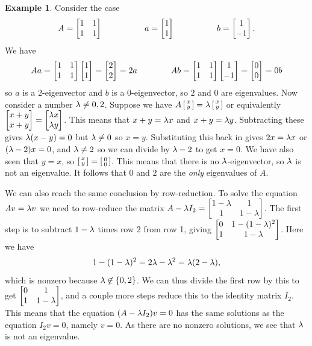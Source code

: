 \documentclass[reqno]{amsart}
\theoremstyle{definition}
\newtheorem{example}[theorem]{Example}
\begin{document}
\begin{example}\label{eg-eigen-i}
 Consider the case
 \[ A = \left[\begin{matrix} 1 & 1 \\ 1 & 1 \end{matrix}\right] \hspace{5em}
     a = \left[\begin{matrix} 1 \\ 1 \end{matrix}\right] \hspace{5em} b = \left[\begin{matrix} 1 \\ -1 \end{matrix}\right].
 \]
 We have
 \[ Aa = \left[\begin{matrix} 1&1 \\ 1&1\end{matrix}\right] \left[\begin{matrix} 1 \\ 1\end{matrix}\right] = \left[\begin{matrix} 2\\ 2\end{matrix}\right] = 2a
    \hspace{4em}
    Ab = \left[\begin{matrix} 1&1 \\ 1&1\end{matrix}\right] \left[\begin{matrix} 1 \\ -1\end{matrix}\right] = \left[\begin{matrix} 0\\ 0\end{matrix}\right] = 0b
 \]
 so $a$ is a $2$-eigenvector and $b$ is a $0$-eigenvector, so $2$ and
 $0$ are eigenvalues.  Now consider a number $\lambda\neq 0,2$.  Suppose
 we have $A\left[\begin{smallmatrix} x\\ y\end{smallmatrix}\right] = \lambda\left[\begin{smallmatrix} x\\ y\end{smallmatrix}\right]$ or equivalently
 $\left[\begin{matrix} x+y\\x+y\end{matrix}\right]=\left[\begin{matrix}\lambda x\\ \lambda y\end{matrix}\right]$.  This means that
 $x+y=\lambda x$ and $x+y=\lambda y$.  Subtracting these gives $\lambda(x-y)=0$
 but $\lambda\neq 0$ so $x=y$.  Substituting this back in gives $2x=\lambda x$
 or $(\lambda-2)x=0$, and $\lambda\neq 2$ so we can divide by $\lambda-2$ to get
 $x=0$.  We have also seen that $y=x$, so
 $\left[\begin{smallmatrix} x\\ y\end{smallmatrix}\right]=\left[\begin{smallmatrix} 0\\ 0\end{smallmatrix}\right]$.  This means that there is no
 $\lambda$-eigenvector, so $\lambda$ is not an eigenvalue.  It follows that
 $0$ and $2$ are the \emph{only} eigenvalues of $A$.

 We can also reach the same conclusion by row-reduction.  To solve the
 equation $Av=\lambda v$ we need to row-reduce the matrix
 $A-\lambda I_2=\left[\begin{matrix} 1-\lambda & 1 \\ 1 & 1-\lambda\end{matrix}\right]$.  The first step is to
 subtract $1-\lambda$ times row 2 from row 1, giving
 $\left[\begin{matrix} 0 & 1-(1-\lambda)^2 \\ 1 & 1-\lambda\end{matrix}\right]$.  Here we have
 \[ 1-(1-\lambda)^2 = 2\lambda - \lambda^2 = \lambda(2-\lambda), \]
 which is nonzero because $\lambda\not\in\{0,2\}$.  We can thus divide the
 first row by this to get $\left[\begin{matrix} 0&1 \\ 1&1-\lambda\end{matrix}\right]$, and a couple more
 steps reduce this to the identity matrix $I_2$.  This means that the
 equation $(A-\lambda I_2)v=0$ has the same solutions as the equation
 $I_2v=0$, namely $v=0$.  As there are no nonzero solutions, we see
 that $\lambda$ is not an eigenvalue.
\end{example}
\end{document}

